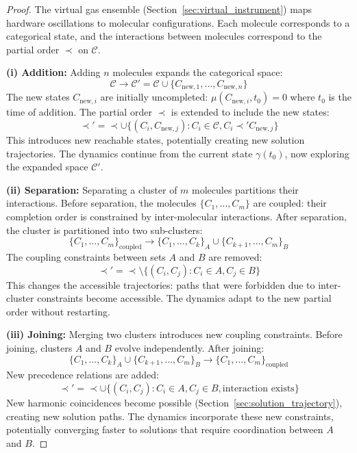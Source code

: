 \begin{proof}
The virtual gas ensemble (Section~\ref{sec:virtual_instrument}) maps hardware oscillations to molecular configurations. Each molecule corresponds to a categorical state, and the interactions between molecules correspond to the partial order $\prec$ on $\mathcal{C}$.

\textbf{(i) Addition:} Adding $n$ molecules expands the categorical space:
\begin{equation}
\mathcal{C} \to \mathcal{C}' = \mathcal{C} \cup \{C_{\text{new},1}, \ldots, C_{\text{new},n}\}
\end{equation}
The new states $C_{\text{new},i}$ are initially uncompleted: $\mu(C_{\text{new},i}, t_0) = 0$ where $t_0$ is the time of addition. The partial order $\prec$ is extended to include the new states:
\begin{equation}
\prec' = \prec \cup \{(C_i, C_{\text{new},j}) : C_i \in \mathcal{C}, C_i \prec' C_{\text{new},j}\}
\end{equation}
This introduces new reachable states, potentially creating new solution trajectories. The dynamics continue from the current state $\gamma(t_0)$, now exploring the expanded space $\mathcal{C}'$.

\textbf{(ii) Separation:} Separating a cluster of $m$ molecules partitions their interactions. Before separation, the molecules $\{C_1, \ldots, C_m\}$ are coupled: their completion order is constrained by inter-molecular interactions. After separation, the cluster is partitioned into two sub-clusters:
\begin{equation}
\{C_1, \ldots, C_m\}_{\text{coupled}} \to \{C_1, \ldots, C_k\}_A \cup \{C_{k+1}, \ldots, C_m\}_B
\end{equation}
The coupling constraints between sets $A$ and $B$ are removed:
\begin{equation}
\prec' = \prec \setminus \{(C_i, C_j) : C_i \in A, C_j \in B\}
\end{equation}
This changes the accessible trajectories: paths that were forbidden due to inter-cluster constraints become accessible. The dynamics adapt to the new partial order without restarting.

\textbf{(iii) Joining:} Merging two clusters introduces new coupling constraints. Before joining, clusters $A$ and $B$ evolve independently. After joining:
\begin{equation}
\{C_1, \ldots, C_k\}_A \cup \{C_{k+1}, \ldots, C_m\}_B \to \{C_1, \ldots, C_m\}_{\text{coupled}}
\end{equation}
New precedence relations are added:
\begin{equation}
\prec' = \prec \cup \{(C_i, C_j) : C_i \in A, C_j \in B, \text{interaction exists}\}
\end{equation}
New harmonic coincidences become possible (Section~\ref{sec:solution_trajectory}), creating new solution paths. The dynamics incorporate these new constraints, potentially converging faster to solutions that require coordination between $A$ and $B$.


\end{proof}

